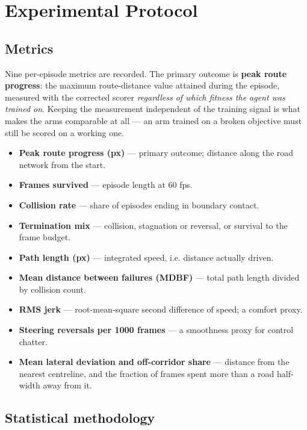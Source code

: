 \documentclass[conference]{IEEEtran}
\begin{document}
\section{Experimental Protocol}

\label{sec:protocol}

\subsection{Metrics}

Nine per-episode metrics are recorded. The primary outcome is \textbf{peak route progress}: the maximum route-distance value attained during the episode, measured with the corrected scorer \emph{regardless of which fitness the agent was trained on}. Keeping the measurement independent of the training signal is what makes the arms comparable at all — an arm trained on a broken objective must still be scored on a working one.

\begin{itemize}
\item \textbf{Peak route progress (px)} — primary outcome; distance along the road network from the start.
\item \textbf{Frames survived} — episode length at 60 fps.
\item \textbf{Collision rate} — share of episodes ending in boundary contact.
\item \textbf{Termination mix} — collision, stagnation or reversal, or survival to the frame budget.
\item \textbf{Path length (px)} — integrated speed, i.e. distance actually driven.
\item \textbf{Mean distance between failures (MDBF)} — total path length divided by collision count.
\item \textbf{RMS jerk} — root-mean-square second difference of speed; a comfort proxy.
\item \textbf{Steering reversals per 1000 frames} — a smoothness proxy for control chatter.
\item \textbf{Mean lateral deviation and off-corridor share} — distance from the nearest centreline, and the fraction of frames spent more than a road half-width away from it.
\end{itemize}

\subsection{Statistical methodology}
\end{document}
